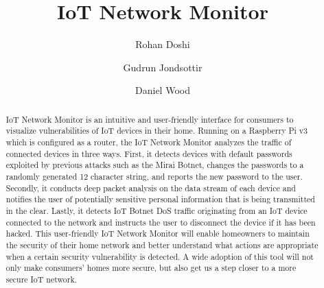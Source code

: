 \documentclass[sigconf]{acmart}
\begin{document}
\title{IoT Network Monitor} 
\author{Rohan Doshi}
\author{Gudrun Jondsottir}
\author{Daniel Wood}

\begin{abstract}
IoT Network Monitor is an intuitive and user-friendly interface for consumers to visualize vulnerabilities of IoT devices in their home. Running on a Raspberry Pi v3 which is configured as a router, the IoT Network Monitor analyzes the traffic of connected devices in three ways. First, it detects devices with default passwords exploited by previous attacks such as the Mirai Botnet, changes the passwords to a randomly generated 12 character string, and reports the new password to the user. Secondly, it conducts deep packet analysis on the data stream of each device and notifies the user of potentially sensitive personal information that is being transmitted in the clear. Lastly, it detects IoT Botnet DoS traffic originating from an IoT device connected to the network and instructs the user to disconnect the device if it has been hacked. This user-friendly IoT Network Monitor will enable homeowners to maintain the security of their home network and better understand what actions are appropriate when a certain security vulnerability is detected. A wide adoption of this tool will not only make consumers' homes more secure, but also get us a step closer to a more secure IoT network.
\end{abstract}


\maketitle




\end{document}
